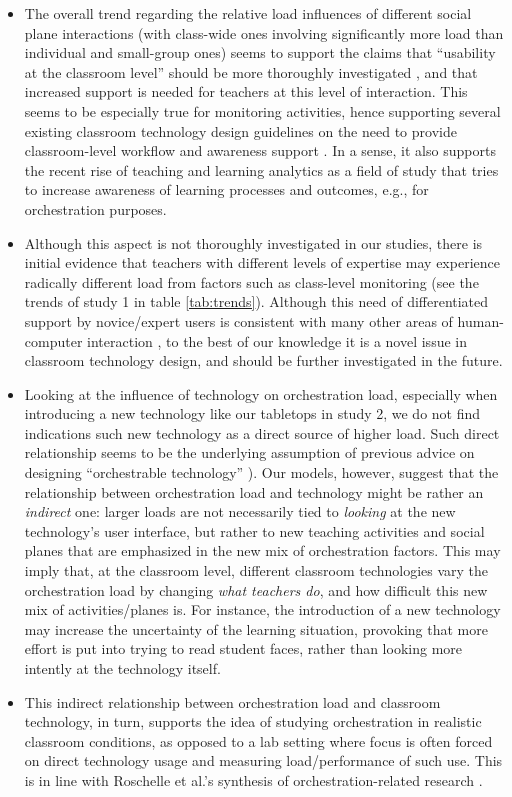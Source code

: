 \documentclass[10pt,journal,compsoc]{IEEEtran}
\begin{document}
\begin{itemize}
\item The overall trend regarding the relative load influences of different social plane interactions (with class-wide ones involving significantly more load than individual and small-group ones) seems to support the claims that ``usability at the classroom level'' should be more thoroughly investigated \cite{Dillenbourg2011}, and that increased support is needed for teachers at this level of interaction. This seems to be especially true for monitoring activities, hence supporting several existing classroom technology design guidelines on the need to provide classroom-level workflow and awareness support \cite{Kharrufa2013,Kreitmayer2013,Dillenbourg2013}. In a sense, it also supports the recent rise of teaching and learning analytics as a field of study that tries to increase awareness of learning processes and outcomes, e.g., for orchestration purposes.
\item Although this aspect is not thoroughly investigated in our studies, there is initial evidence that teachers with different levels of expertise may experience radically different load from factors such as class-level monitoring (see the trends of study 1 in table \ref{tab:trends}). Although this need of differentiated support by novice/expert users is consistent with many other areas of human-computer interaction \cite{ziefle2002influence}, to the best of our knowledge it is a novel issue in classroom technology design, and should be further investigated in the future.
\item Looking at the influence of technology on orchestration load, especially when introducing a new technology like our tabletops in study 2, we do not find indications such new technology as a direct source of higher load. Such direct relationship seems to be the underlying assumption of previous advice on designing ``orchestrable technology'' \cite{cuendet2013benefits}). Our models, however, suggest that the relationship between orchestration load and technology might be rather an \textit{indirect} one: larger loads are not necessarily tied to \textit{looking} at the new technology's user interface, but rather to new teaching activities and social planes that are emphasized in the new mix of orchestration factors. This may imply that, at the classroom level, different classroom technologies vary the orchestration load by changing \textit{what teachers do}, and how difficult this new mix of activities/planes is. For instance, the introduction of a new technology may increase the uncertainty of the learning situation, provoking that more effort is put into trying to read student faces, rather than looking more intently at the technology itself.
\item This indirect relationship between orchestration load and classroom technology, in turn, supports the idea of studying orchestration in realistic classroom conditions, as opposed to a lab setting where focus is often forced on direct technology usage and measuring load/performance of such use. This is in line with Roschelle et al.'s synthesis of orchestration-related research \cite{Roschelle2013}.
\end{itemize}
\end{document}
